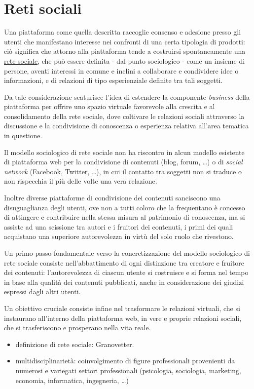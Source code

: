 \documentclass[12pt,a4paper,headsepline,hidelinks]{scrreprt} %
\begin{document}
	\section{Reti sociali}
	Una piattaforma come quella descritta raccoglie consenso e adesione presso gli utenti che manifestano interesse nei confronti di una certa tipologia di prodotti: ciò significa che attorno alla piattaforma tende a costruirsi spontaneamente una \underline{rete sociale}, che può essere definita - dal punto sociologico - come un insieme di persone, aventi interessi in comune e inclini a collaborare e condividere idee o informazioni, e di relazioni di tipo esperienziale definite tra tali soggetti.

	Da tale considerazione scaturisce l'idea di estendere la componente \textit{business} della piattaforma per offrire uno spazio virtuale favorevole alla crescita e al consolidamento della rete sociale, dove coltivare le relazioni sociali attraverso la discussione e la condivisione di conoscenza o esperienza relativa all'area tematica in questione.

	Il modello sociologico di rete sociale non ha riscontro in alcun modello esistente di piattaforma web per la condivisione di contenuti (blog, forum, \ldots) o di \textit{social network} (Facebook, Twitter, \ldots), in cui il contatto tra soggetti non si traduce o non rispecchia il più delle volte una vera relazione.

	Inoltre diverse piattaforme di condivisione dei contenuti sanciscono una disuguaglianza degli utenti, ove non a tutti coloro che la frequentano è concesso di attingere e contribuire nella stessa misura al patrimonio di conoscenza, ma si assiste ad una scissione tra autori e i fruitori dei contenuti, i primi dei quali acquistano una superiore autorevolezza in virtù del solo ruolo che rivestono.

	Un primo passo fondamentale verso la concretizzazione del modello sociologico di rete sociale consiste nell'abbattimento di ogni distinzione tra creatore e fruitore dei contenuti: l'autorevolezza di ciascun utente si costruisce e si forma nel tempo in base alla qualità dei contenuti pubblicati, anche in considerazione dei giudizi espressi dagli altri utenti.

	Un obiettivo cruciale consiste infine nel trasformare le relazioni virtuali, che si instaurano all'interno della piattaforma web, in vere e proprie relazioni sociali, che si trasferiscono e prosperano nella vita reale.

	\begin{itemize}
	\item definizione di rete sociale: Granovetter.
	\item multidisciplinarietà: coinvolgimento di figure professionali provenienti da numerosi e variegati settori professionali (psicologia, sociologia, marketing, economia, informatica, ingegneria, \ldots)
	\end{itemize}
\end{document}
